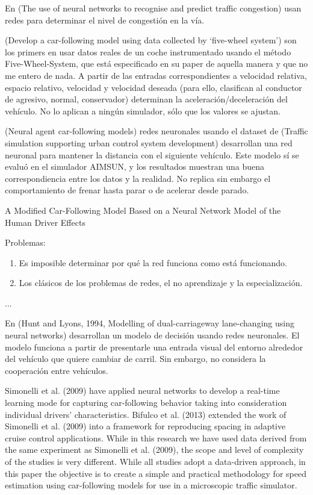 En (The  use  of  neural  networks  to  recognise  and
predict traffic congestion) usan redes para determinar el nivel de congestión en la vía.

(Develop a car-following model using data collected by ‘five-wheel
system’) son los primers en usar datos reales de un coche instrumentado usando el método Five-Wheel-System, que está especificado en su paper de aquella manera y que no me entero de nada. A partir de las entradas correspondientes a velocidad relativa, espacio relativo, velocidad y velocidad deseada (para ello, clasifican al conductor de agresivo, normal, conservador) determinan la aceleración/deceleración del vehículo. No lo aplican a ningún simulador, sólo que los valores se ajustan.

(Neural agent car-following models) redes neuronales usando el dataset de (Traffic simulation supporting urban control system development) desarrollan una red neuronal para mantener la distancia con el siguiente vehículo. Este modelo sí se evaluó en el simulador AIMSUN, y los resultados muestran una buena correspondiencia entre los datos y la realidad. No replica sin embargo el comportamiento de frenar hasta parar o de acelerar desde parado.

A Modified Car-Following Model Based on a Neural Network Model of the Human Driver Effects


Problemas:

\begin{enumerate}
	\item Es imposible determinar por qué la red funciona como está funcionando.
	\item Los clásicos de los problemas de redes, el no aprendizaje y la especialización.
\end{enumerate}

...

En (Hunt and Lyons, 1994, Modelling of dual-carriageway lane-changing using neural networks) desarrollan un modelo de decisión usando redes neuronales. El modelo funciona a partir de presentarle una entrada visual del entorno alrededor del vehículo que quiere cambiar de carril. Sin embargo, no considera la cooperación entre vehículos.

Simonelli et al. (2009) have applied neural networks to develop a real-time learning mode for capturing car-following behavior taking into consideration individual drivers’ characteristics. Bifulco et al. (2013) extended the work of Simonelli et al. (2009) into a framework for reproducing spacing in adaptive cruise control applications. While in this research we have used data derived from the same experiment as Simonelli et al. (2009), the scope and level of complexity of the studies is very different. While all studies adopt a data-driven approach, in this paper the objective is to create a simple and practical methodology for speed estimation using car-following models for use in a microscopic traffic simulator.

